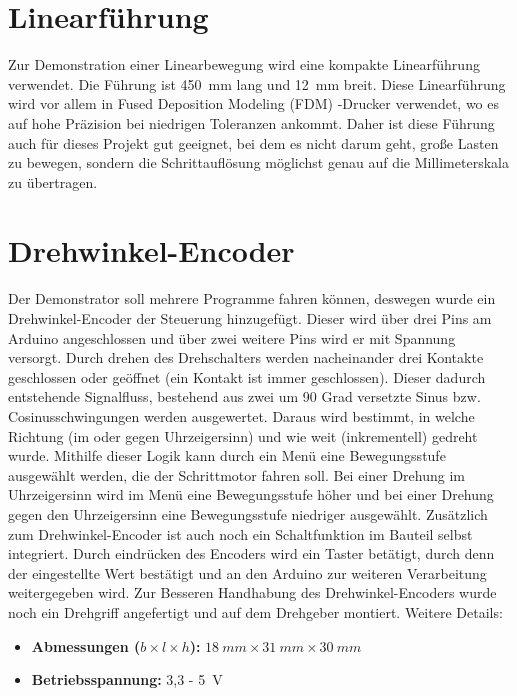 \section{Linearführung}

Zur Demonstration einer Linearbewegung wird eine kompakte Linearführung verwendet. Die Führung ist 450\ mm lang und 12\ mm breit. Diese Linearführung wird vor allem in Fused Deposition Modeling (FDM) -Drucker verwendet, wo es auf hohe Präzision bei niedrigen Toleranzen ankommt. Daher ist diese Führung auch für dieses Projekt gut geeignet, bei dem es nicht darum geht, große Lasten zu bewegen, sondern die Schrittauflösung möglichst genau auf die Millimeterskala zu übertragen.\cite{RoboterBausatz.2024}

\section{Drehwinkel-Encoder}

Der Demonstrator soll mehrere Programme fahren können, deswegen wurde ein Drehwinkel-Encoder der Steuerung hinzugefügt. Dieser wird über drei Pins am Arduino angeschlossen und über zwei weitere Pins wird er mit Spannung versorgt. Durch drehen des Drehschalters werden nacheinander drei Kontakte geschlossen oder geöffnet (ein Kontakt ist immer geschlossen). Dieser dadurch entstehende Signalfluss, bestehend aus zwei um 90 Grad versetzte Sinus bzw. Cosinusschwingungen werden ausgewertet. Daraus wird bestimmt, in welche Richtung (im oder gegen Uhrzeigersinn) und wie weit (inkrementell) gedreht wurde. Mithilfe dieser Logik kann durch ein Menü eine Bewegungsstufe ausgewählt werden, die der Schrittmotor fahren soll.\cite{Basler.2016} Bei einer Drehung im Uhrzeigersinn wird im Menü eine Bewegungsstufe höher und bei einer Drehung gegen den Uhrzeigersinn eine Bewegungsstufe niedriger ausgewählt. Zusätzlich zum Drehwinkel-Encoder ist auch noch ein Schaltfunktion im Bauteil selbst integriert. Durch eindrücken des Encoders wird ein Taster betätigt, durch denn der eingestellte Wert bestätigt und an den Arduino zur weiteren Verarbeitung weitergegeben wird. Zur Besseren Handhabung des Drehwinkel-Encoders wurde noch ein Drehgriff angefertigt und auf dem Drehgeber montiert.
Weitere Details: 
\begin{itemize}
	\item \textbf{Abmessungen ($b \times l \times h$):} $18 \ mm \times 31 \ mm \times 30 \ mm$
	\item \textbf{Betriebsspannung:} 3,3 - 5\ V
	\cite{SimacElec.2019}
\end{itemize}


